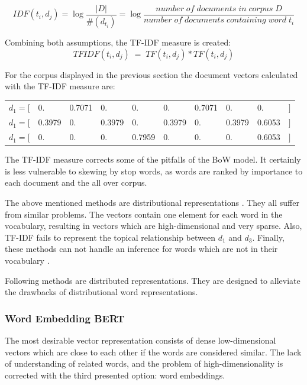             \[ IDF(t_{i}, d_{j}) = \log \dfrac{|D|}{\#(d_{t_{i}}) } =  \log \dfrac{number \;  of\;  documents \;  in \; corpus \; D}{ number \; of \; documents \; containing \; word \; t_{i}} \]
            
            Combining both assumptions, the \ac{TF-IDF} measure is created:
             \[ TFIDF(t_{i}, d_{j}) \;=\; TF(t_{i}, d_{j}) * TF(t_{i}, d_{j})\]
            
            For the corpus displayed in the previous section the document vectors calculated with the \ac{TF-IDF} measure are:

           \begin{table}[!ht]
           	\centering
           	\begin{tabular}{llllllllll}
           		$d_1 = [$ & 0.     & 0.7071 & 0.     & 0.     & 0.     & 0.7071 & 0.     & 0.     & $]$ \\
           		$d_1 = [$ & 0.3979 & 0.     & 0.3979 & 0.     & 0.3979 & 0.     & 0.3979 & 0.6053 & $]$ \\
           		$d_1 = [$ & 0.     & 0.     & 0.     & 0.7959 & 0.     & 0.     & 0.     & 0.6053 & $]$
           	\end{tabular}
           \end{table}
                
            The \ac{TF-IDF} measure corrects some of the pitfalls of the \ac{BoW} model. It certainly is less vulnerable to skewing by stop words,  as words are ranked by importance to each document and the all over corpus. 
            
        
            The above mentioned methods are distributional representations \cite[ch.~3.3]{practicalNLP}. They all suffer from similar problems. The vectors contain one element for each word in the vocabulary, resulting in vectors which are high-dimensional and very sparse. Also, \ac{TF-IDF} fails to represent the topical relationship between $ d_{1} $ and $ d_{3}$. Finally, these methods can not handle an inference for words which are not in their vocabulary \cite[ch.~3.2]{practicalNLP}.
            
            Following methods are distributed representations. They are designed to alleviate the drawbacks of distributional word representations.
            
            \subsubsection{Word Embedding BERT}
             The most desirable vector representation consists of dense low-dimensional vectors which are close to each other if the words are considered similar. The lack of understanding of related words, and the problem of high-dimensionality is corrected with the third presented option: word embeddings.
            
